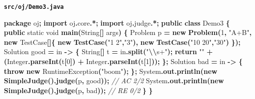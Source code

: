 \documentclass[
  11pt,
]{ctexart}
\newenvironment{Shaded}{\begin{snugshade}}{\end{snugshade}}
\newcommand{\BuiltInTok}[1]{#1}
\newcommand{\CommentTok}[1]{\textcolor[rgb]{0.56,0.35,0.01}{\textit{#1}}}
\newcommand{\ControlFlowTok}[1]{\textcolor[rgb]{0.13,0.29,0.53}{\textbf{#1}}}
\newcommand{\DataTypeTok}[1]{\textcolor[rgb]{0.13,0.29,0.53}{#1}}
\newcommand{\DecValTok}[1]{\textcolor[rgb]{0.00,0.00,0.81}{#1}}
\newcommand{\FunctionTok}[1]{\textcolor[rgb]{0.13,0.29,0.53}{\textbf{#1}}}
\newcommand{\ImportTok}[1]{#1}
\newcommand{\KeywordTok}[1]{\textcolor[rgb]{0.13,0.29,0.53}{\textbf{#1}}}
\newcommand{\NormalTok}[1]{#1}
\newcommand{\OperatorTok}[1]{\textcolor[rgb]{0.81,0.36,0.00}{\textbf{#1}}}
\newcommand{\SpecialCharTok}[1]{\textcolor[rgb]{0.81,0.36,0.00}{\textbf{#1}}}
\newcommand{\StringTok}[1]{\textcolor[rgb]{0.31,0.60,0.02}{#1}}
\begin{document}
\textbf{\texttt{src/oj/Demo3.java}}

\begin{Shaded}
\begin{Highlighting}[]
\KeywordTok{package}\ImportTok{ oj}\OperatorTok{;}
\KeywordTok{import} \ImportTok{oj}\OperatorTok{.}\ImportTok{core}\OperatorTok{.*;}
\KeywordTok{import} \ImportTok{oj}\OperatorTok{.}\ImportTok{judge}\OperatorTok{.*;}
\KeywordTok{public} \KeywordTok{class}\NormalTok{ Demo3 }\OperatorTok{\{}
    \KeywordTok{public} \DataTypeTok{static} \DataTypeTok{void} \FunctionTok{main}\OperatorTok{(}\BuiltInTok{String}\OperatorTok{[]}\NormalTok{ args}\OperatorTok{)} \OperatorTok{\{}
\NormalTok{        Problem p }\OperatorTok{=} \KeywordTok{new} \FunctionTok{Problem}\OperatorTok{(}\DecValTok{1}\OperatorTok{,} \StringTok{"A+B"}\OperatorTok{,} \KeywordTok{new}\NormalTok{ TestCase}\OperatorTok{[]\{} \KeywordTok{new} \FunctionTok{TestCase}\OperatorTok{(}\StringTok{"1 2"}\OperatorTok{,}\StringTok{"3"}\OperatorTok{),} \KeywordTok{new} \FunctionTok{TestCase}\OperatorTok{(}\StringTok{"10 20"}\OperatorTok{,}\StringTok{"30"}\OperatorTok{)} \OperatorTok{\});}
\NormalTok{        Solution good }\OperatorTok{=}\NormalTok{ in }\OperatorTok{{-}\textgreater{}} \OperatorTok{\{} \BuiltInTok{String}\OperatorTok{[]}\NormalTok{ t }\OperatorTok{=}\NormalTok{ in}\OperatorTok{.}\FunctionTok{split}\OperatorTok{(}\StringTok{"}\SpecialCharTok{\textbackslash{}\textbackslash{}}\StringTok{s+"}\OperatorTok{);} \ControlFlowTok{return} \StringTok{""} \OperatorTok{+} \OperatorTok{(}\BuiltInTok{Integer}\OperatorTok{.}\FunctionTok{parseInt}\OperatorTok{(}\NormalTok{t}\OperatorTok{[}\DecValTok{0}\OperatorTok{])} \OperatorTok{+} \BuiltInTok{Integer}\OperatorTok{.}\FunctionTok{parseInt}\OperatorTok{(}\NormalTok{t}\OperatorTok{[}\DecValTok{1}\OperatorTok{]));} \OperatorTok{\};}
\NormalTok{        Solution bad  }\OperatorTok{=}\NormalTok{ in }\OperatorTok{{-}\textgreater{}} \OperatorTok{\{} \ControlFlowTok{throw} \KeywordTok{new} \BuiltInTok{RuntimeException}\OperatorTok{(}\StringTok{"boom"}\OperatorTok{);} \OperatorTok{\};}
        \BuiltInTok{System}\OperatorTok{.}\FunctionTok{out}\OperatorTok{.}\FunctionTok{println}\OperatorTok{(}\KeywordTok{new} \FunctionTok{SimpleJudge}\OperatorTok{().}\FunctionTok{judge}\OperatorTok{(}\NormalTok{p}\OperatorTok{,}\NormalTok{ good}\OperatorTok{));}   \CommentTok{// AC 2/2}
        \BuiltInTok{System}\OperatorTok{.}\FunctionTok{out}\OperatorTok{.}\FunctionTok{println}\OperatorTok{(}\KeywordTok{new} \FunctionTok{SimpleJudge}\OperatorTok{().}\FunctionTok{judge}\OperatorTok{(}\NormalTok{p}\OperatorTok{,}\NormalTok{ bad}\OperatorTok{));}    \CommentTok{// RE 0/2}
    \OperatorTok{\}}
\OperatorTok{\}}
\end{Highlighting}
\end{Shaded}
\end{document}
